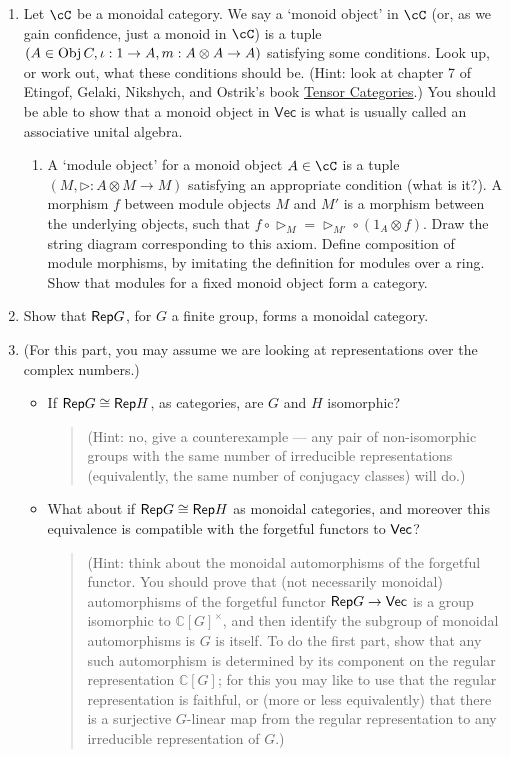 \documentclass[12pt]{amsart}
\begin{document}
\begin{enumerate}
\item Let $\cC$ be a monoidal category. We say a `monoid object' in $\cC$ (or, as we gain confidence, just a monoid in $\cC$) is a tuple $(A \in \Obj C, \iota: 1 \to A, m: A \otimes A \to A)$ satisfying some conditions. Look up, or work out, what these conditions should be. (Hint: look at chapter 7 of Etingof, Gelaki, Nikshych, and Ostrik's book \href{http://www-math.mit.edu/~etingof/egnobookfinal.pdf}{Tensor Categories}.) You should be able to show that a monoid object in $\mathsf{Vec}$ is what is usually called an associative unital algebra.
\begin{enumerate}
\item A `module object' for a monoid object $A \in \cC$ is a tuple $(M, \triangleright: A \otimes M \to M)$ satisfying an appropriate condition (what is it?). A morphism $f$ between module objects $M$ and $M'$ is a morphism between the underlying objects, such that $f \circ \triangleright_M = \triangleright_{M'} \circ (1_A \otimes f)$. Draw the string diagram corresponding to this axiom. Define composition of module morphisms, by imitating the definition for modules over a ring. Show that modules for a fixed monoid object form a category.
\end{enumerate}
\item Show that $\Rep G$, for $G$ a finite group, forms a monoidal category.
\item (For this part, you may assume we are looking at representations over the complex numbers.)
\begin{itemize}
\item If $\Rep G \cong \Rep H$, as categories, are $G$ and $H$ isomorphic?
\begin{quote}
(Hint: no, give a counterexample --- any pair of non-isomorphic groups with the same number of irreducible representations (equivalently, the same number of conjugacy classes) will do.)
\end{quote}
\item
What about if $\Rep G \cong \Rep H$ as monoidal categories, and moreover this equivalence is compatible with the forgetful functors to $\Vec$?
\begin{quote}
(Hint: think about the monoidal automorphisms of the forgetful functor. You should prove that (not necessarily monoidal) automorphisms of the forgetful functor $\Rep G \to \Vec$ is a group isomorphic to $\mathbb C[G]^{\times}$, and then identify the subgroup of monoidal automorphisms is $G$ is itself. To do the first part, show that any such automorphism is determined by its component on the regular representation $\mathbb C[G]$; for this you may like to use that the regular representation is faithful, or (more or less equivalently) that there is a surjective $G$-linear map from the regular representation to any irreducible representation of $G$.)
\end{quote}
\end{itemize}
\end{enumerate}
\end{document}
